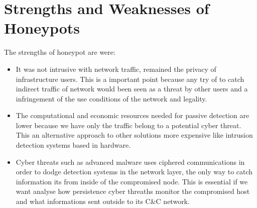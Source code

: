 \documentclass[a4paper]{llncs}
\begin{document}
\section{Strengths and Weaknesses of Honeypots}
\label{sec:Strengths&Weaknesse}
The strengths of honeypot are were:
\begin{itemize}
	\item It was not intrusive with network traffic, remained the privacy of infrastructure users. This is a important point because any try of to catch indirect traffic of network would been seen as a threat by other users and a infringement of the use conditions of the network and legality.
	\item The computational and economic resources needed for passive detection are lower because we have only the traffic belong to a potential cyber threat. This an alternative approach to other solutions more expensive like intrusion detection systems based in hardware.
	\item Cyber threats such as advanced malware uses ciphered communications in order to dodge detection systems in the network layer, the only way to catch information its from inside of the compromised node. This is essential if we want analyse how persistence cyber threaths monitor the compromised host and what informations sent outside to its C\&C network.
\end{itemize}
	
\end{document}
